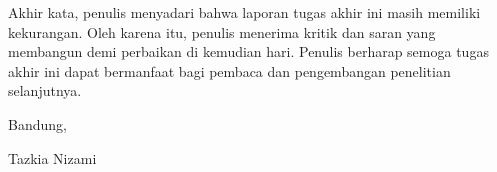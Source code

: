 Akhir kata, penulis menyadari bahwa laporan tugas akhir ini masih memiliki kekurangan. Oleh karena itu, penulis menerima kritik dan saran yang membangun demi perbaikan di kemudian hari. Penulis berharap semoga tugas akhir ini dapat bermanfaat bagi pembaca dan pengembangan penelitian selanjutnya.

\begin{flushright}
	\vspace{0.5cm}
	Bandung, \tanggalpengesahan

	\vspace{1.5cm}

	Tazkia Nizami
\end{flushright}
